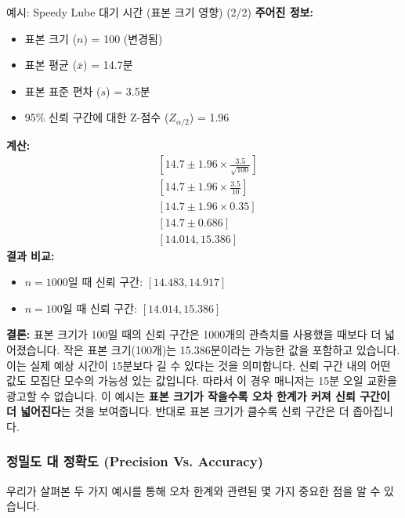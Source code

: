\documentclass[11pt,a4paper]{article}
\begin{document}
\begin{examplebox}{예시: Speedy Lube 대기 시간 (표본 크기 영향) (2/2)}
\textbf{주어진 정보:}
\begin{itemize}
    \item 표본 크기 ($n$) = 100 (변경됨)
    \item 표본 평균 ($\bar{x}$) = 14.7분
    \item 표본 표준 편차 ($s$) = 3.5분
    \item 95\% 신뢰 구간에 대한 Z-점수 ($Z_{\alpha/2}$) = 1.96
\end{itemize}
\textbf{계산:}
\begin{align*}
    & [14.7 \pm 1.96 \times \frac{3.5}{\sqrt{100}}] \\
    & [14.7 \pm 1.96 \times \frac{3.5}{10}] \\
    & [14.7 \pm 1.96 \times 0.35] \\
    & [14.7 \pm 0.686] \\
    & [14.014, 15.386]
\end{align*}
\textbf{결과 비교:}
\begin{itemize}
    \item $n = 1000$일 때 신뢰 구간: $[14.483, 14.917]$
    \item $n = 100$일 때 신뢰 구간: $[14.014, 15.386]$
\end{itemize}
\textbf{결론:}
표본 크기가 100일 때의 신뢰 구간은 1000개의 관측치를 사용했을 때보다 더 넓어졌습니다. 작은 표본 크기(100개)는 15.386분이라는 가능한 값을 포함하고 있습니다. 이는 실제 예상 시간이 15분보다 길 수 있다는 것을 의미합니다. 신뢰 구간 내의 어떤 값도 모집단 모수의 가능성 있는 값입니다. 따라서 이 경우 매니저는 15분 오일 교환을 광고할 수 없습니다.
이 예시는 \textbf{표본 크기가 작을수록 오차 한계가 커져 신뢰 구간이 더 넓어진다}는 것을 보여줍니다. 반대로 표본 크기가 클수록 신뢰 구간은 더 좁아집니다.
\end{examplebox}

\subsubsection*{정밀도 대 정확도 (Precision Vs. Accuracy)}
우리가 살펴본 두 가지 예시를 통해 오차 한계와 관련된 몇 가지 중요한 점을 알 수 있습니다.
\end{document}
